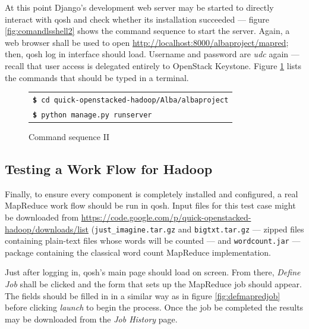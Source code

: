 At this point Django's development web server may be started to directly interact with qosh and check whether its installation succeeded --- figure \ref{fig:comandlsshell2} shows the command sequence to start the server. Again, a web browser shall be used to open \url{http://localhost:8000/albaproject/mapred}; then, qosh log in interface should load. Username and password are \emph{udc} again --- recall that user access is delegated entirely to OpenStack Keystone. Figure \ref{fig:comandosshell2} lists the commands that should be typed in a terminal.

\begin{figure}[tbp]
    \begin{center}
        \begin{tabular}{|l|}
            \hline
            \texttt{{\bf \$} cd quick-openstacked-hadoop/Alba/albaproject} \\
            \texttt{{\bf \$} python manage.py runserver} \\
            \hline
        \end{tabular}
        \caption{Command sequence II}
        \label{fig:comandosshell2}
    \end{center}
\end{figure}

\subsection{Testing a Work Flow for Hadoop}\label{subsec:flujohadoop}
\noindent Finally, to ensure every component is completely installed and configured, a real MapReduce work flow should be run in qosh. Input files for this test case might be downloaded from \url{https://code.google.com/p/quick-openstacked-hadoop/downloads/list} (\texttt{just\_imagine.tar.gz} and \texttt{bigtxt.tar.gz} --- zipped files containing plain-text files whose words will be counted --- and \texttt{wordcount.jar} --- package containing the classical word count MapReduce implementation.

Just after logging in, qosh's main page should load on screen. From there, \emph{Define Job} shall be clicked and the form that sets up the MapReduce job should appear. The fields should be filled in in a similar way as in figure \ref{fig:defmapredjob} before clicking \emph{launch} to begin the process. Once the job be completed the results may be downloaded from the \emph{Job History} page.

